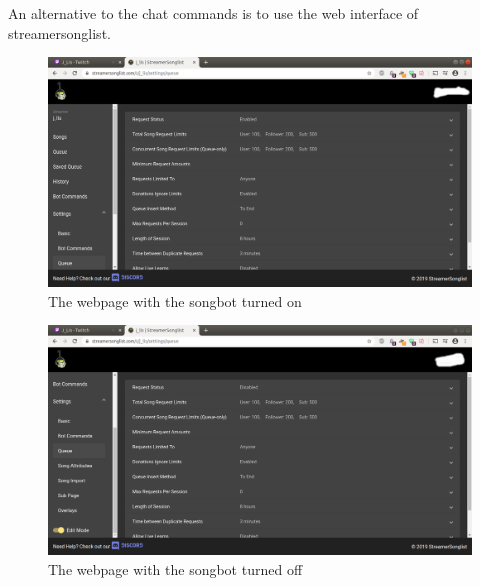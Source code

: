 An alternative to the chat commands is to use the web interface of \mbox{streamersonglist}.
\begin{figure}[ht!]
  \includegraphics[width=\linewidth]{src/songbot_on_off/bot_on.png}
  \caption{The webpage with the songbot turned on}
  \label{bot is on}
\end{figure}
\begin{figure}[ht!]
  \includegraphics[width=\linewidth]{src/songbot_on_off/bot_off.png}
  \caption{The webpage with the songbot turned off}
  \label{bot is off}
\end{figure}


